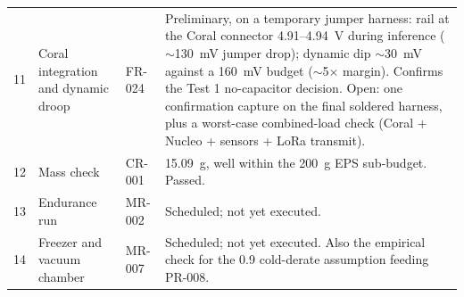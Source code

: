 \begin{longtable}{p{0.9cm}p{3.2cm}p{1.6cm}p{8.5cm}}
11 & Coral integration and dynamic droop & FR-024 & Preliminary, on a temporary jumper harness: rail at the Coral connector 4.91--4.94~V during inference ($\sim$130~mV jumper drop); dynamic dip $\sim$30~mV against a 160~mV budget ($\sim$5$\times$ margin). Confirms the Test 1 no-capacitor decision. Open: one confirmation capture on the final soldered harness, plus a worst-case combined-load check (Coral + Nucleo + sensors + LoRa transmit). \\
12 & Mass check & CR-001 & 15.09~g, well within the 200~g EPS sub-budget. Passed. \\
13 & Endurance run & MR-002 & Scheduled; not yet executed. \\
14 & Freezer and vacuum chamber & MR-007 & Scheduled; not yet executed. Also the empirical check for the 0.9 cold-derate assumption feeding PR-008. \\
\end{longtable}
